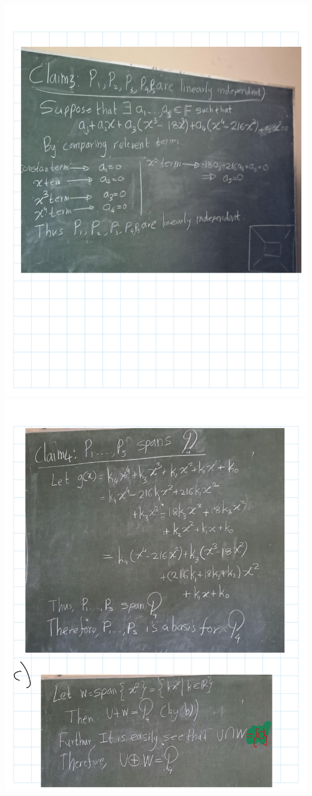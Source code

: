 \documentclass[
]{book}
\theoremstyle{definition}
\theoremstyle{definition}
\theoremstyle{definition}
\theoremstyle{definition}
\theoremstyle{remark}
\begin{document}
\includegraphics{fig/Ex 2B and 2C/Ex 2c (18).png}
\includegraphics{fig/Ex 2B and 2C/Ex 2c (19).png}
\end{document}
